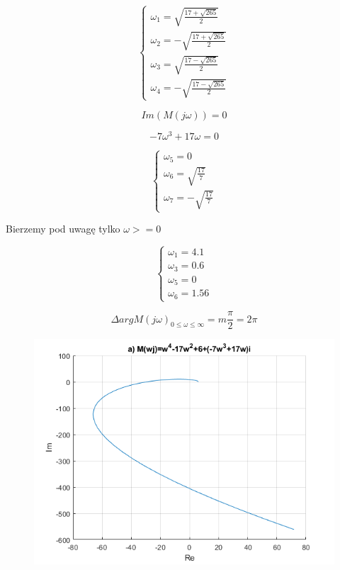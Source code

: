 \documentclass{article}
\begin{document}
\begin{itemize}
    \[\begin{cases}
        \omega_{1}=\sqrt{\frac{17+\sqrt{265}}{2}}
        \\
        \omega_{2}=-\sqrt{\frac{17+\sqrt{265}}{2}}
        \\
        \omega_{3}=\sqrt{\frac{17-\sqrt{265}}{2}}
        \\
        \omega_{4}=-\sqrt{\frac{17-\sqrt{265}}{2}}
    \end{cases}\]

    $$Im(M(j\omega))=0$$

    $$ -7\omega^{3}+17\omega=0 $$

    \[\begin{cases}
        \omega_{5}=0\\
        \omega_{6}=\sqrt{\frac{17}{7}}\\
        \omega_{7}=-\sqrt{\frac{17}{7}}
    \end{cases}\]

    Bierzemy pod uwagę tylko $\omega>=0$

    \[\begin{cases}
        \omega_{1}=4.1\\
        \omega_{3}=0.6\\
        \omega_{5}=0\\
        \omega_{6}=1.56
    \end{cases}\]

    $$\Delta argM(j\omega)_{0\leq \omega \le \infty }=m\frac{\pi}{2}=2\pi$$

    \begin{figure}[h!]
        \includegraphics[scale=0.4]{a.png}
        \centering
    \end{figure}


\end{itemize}
\end{document}
